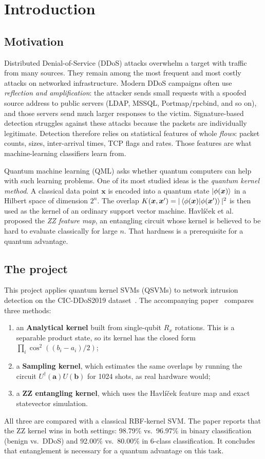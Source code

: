\section{Introduction}
\label{sec:intro}

\subsection{Motivation}
Distributed Denial-of-Service (DDoS) attacks overwhelm a target with traffic from many sources.
They remain among the most frequent and most costly attacks on networked infrastructure. Modern
DDoS campaigns often use \emph{reflection and amplification}: the attacker sends small requests
with a spoofed source address to public servers (LDAP, MSSQL, Portmap/rpcbind, and so on), and
those servers send much larger responses to the victim. Signature-based detection struggles
against these attacks because the packets are individually legitimate. Detection therefore
relies on statistical features of whole \emph{flows}: packet counts, sizes, inter-arrival times,
TCP flags and rates. Those features are what machine-learning classifiers learn from.

Quantum machine learning (QML) asks whether quantum computers can help with such learning
problems. One of its most studied ideas is the \emph{quantum kernel method}. A classical
data point $\bm{x}$ is encoded into a quantum state $\left|\phi(\bm{x})\right\rangle$ in a Hilbert space of
dimension $2^n$. The overlap $K(\bm{x},\bm{x}')=|\left\langle\phi(\bm{x})\middle|\phi(\bm{x}')\right\rangle|^2$ is then
used as the kernel of an ordinary support vector machine. Havlíček et al.~\cite{havlicek2019}
proposed the \emph{ZZ feature map}, an entangling circuit whose kernel is believed to be hard to
evaluate classically for large $n$. That hardness is a prerequisite for a quantum advantage.

\subsection{The project}
This project applies quantum kernel SVMs (QSVMs) to network intrusion detection on the
CIC-DDoS2019 dataset~\cite{sharafaldin2019ddos}. The accompanying paper~\cite{ourpaper} compares three methods:
\begin{enumerate}
  \item an \textbf{Analytical kernel} built from single-qubit $R_x$ rotations. This is a separable
        product state, so its kernel has the closed form $\prod_i\cos^2((b_i-a_i)/2)$;
  \item a \textbf{Sampling kernel}, which estimates the same overlaps by running the circuit
        $U^\dagger(\bm{a})U(\bm{b})$ for 1024 shots, as real hardware would;
  \item a \textbf{ZZ entangling kernel}, which uses the Havlíček feature map and exact statevector simulation.
\end{enumerate}
All three are compared with a classical RBF-kernel SVM. The paper reports that the ZZ kernel wins
in both settings: 98.79\% vs.\ 96.97\% in binary classification (benign vs.\ DDoS) and
92.00\% vs.\ 80.00\% in 6-class classification. It concludes that entanglement is necessary for a
quantum advantage on this task.

